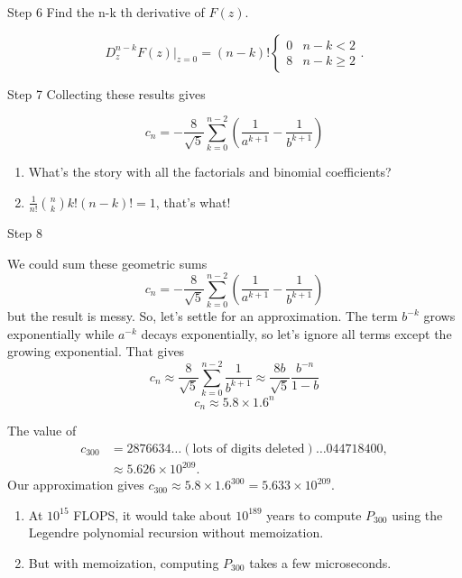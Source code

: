 \documentclass[portrait,fleqn,12pt]{beamer}
\newenvironment{handlist}
   {\begin{enumerate}[\faHandPointRight]
       \addtolength{\itemsep}{0.0\itemsep}}
     {\end{enumerate}}
\begin{document}
\begin{frame}{Step 6}
Find the n-k th derivative of $F(z) $.

\begin{equation}
D^{n-k} _z F(z ) \vert_{z=0}  = (n-k) ! \begin{cases} 0 &  n -k < 2 \\  8  & n -k \geq  2 \end{cases}.
\end{equation}
\end{frame}
\begin{frame}{Step 7}
Collecting these results gives

\[
 c_n = -\frac{8}{\sqrt{5}} \sum_{k=0}^{n-2} \left ( \frac{1}{a^{k+1}} - \frac{1}{b^{k+1}} \right) 
\]

\begin{handlist}
\item What's the story with all the factorials and binomial coefficients?
\item  $\frac{1}{n!} \binom{n}{k} k! (n-k)! = 1$, that's what!
\end{handlist}
\end{frame}

\begin{frame}{Step 8}

We could sum these geometric sums 
\[
 c_n = -\frac{8}{\sqrt{5}} \sum_{k=0}^{n-2} \left ( \frac{1}{a^{k+1}} - \frac{1}{b^{k+1}} \right) 
\]
but the result is messy.  So, let's settle for an approximation. The term $b^{-k}$ grows exponentially while 
$a^{-k}$ decays exponentially, so let's ignore all terms except the growing exponential. That gives
\[
 c_n \approx  \frac{8}{\sqrt{5}} \sum_{k=0}^{n-2} \frac{1}{b^{k+1}} \approx  \frac{8 b}{\sqrt{5}} \frac{{{b}^{-n}}}{1-b}
\]
\begin{equation}
   c_n \approx 5.8 \times 1.6^n
\end{equation}
\end{frame}

\begin{frame}
The value of 
\begin{align*}
c_{300} &= 2876634 \dots (\text{lots of digits deleted}) \dots 044718400, \\
             &\approx 5.626 \times 10^{209}.
\end{align*}
Our approximation gives $c_{300} \approx 5.8 \times 1.6^{300}  =  5.633 \times 10^{209}.$

\begin{handlist}
\item At $10^{15}$ FLOPS, it would take about $10^{189}$ years to compute $P_{300}$ using 
the Legendre polynomial recursion without memoization. 

\item But with memoization, computing $P_{300}$ takes a few microseconds.

\end{handlist}
\end{frame}
\end{document}
